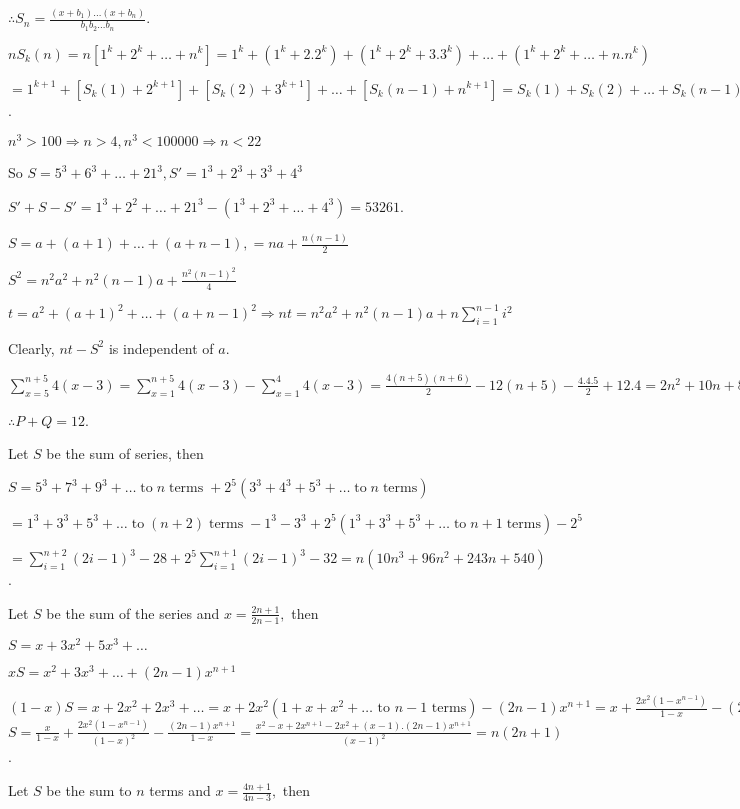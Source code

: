   $\therefore S_n = \frac{(x + b_1)\ldots (x+b_n)}{b_1b_2\ldots b_n}$.
\item $nS_k(n) = n[1^k + 2^k + \ldots + n^k] = 1^k + (1^k + 2.2^k) + (1^k + 2^k + 3.3^k) + \ldots + (1^k +
  2^k + \ldots + n.n^k)$

  $= 1^{k + 1} + [S_k(1) + 2^{k + 1}] + [S_k(2) + 3^{k + 1}] + \ldots + [S_k(n - 1) + n^{k + 1}] = S_k(1) +
  S_k(2) + \ldots + S_k(n - 1) + S_{k + 1}(n)$.
\item $n^3 > 100 \Rightarrow n > 4, n^3 < 100000 \Rightarrow n < 22$

  So $S = 5^3 + 6^3 + \ldots + 21^3, S' = 1^3 + 2^3 + 3^3 + 4^3$

  $S' + S - S' = 1^3 + 2^2 + \ldots + 21^3 - (1^3 + 2^3 + \ldots + 4^3) = 53261$.
\item $S = a + (a + 1) + \ldots + (a + n - 1), = na + \frac{n(n - 1)}{2}$

  $S^2 = n^2a^2 + n^2(n - 1)a + \frac{n^2(n - 1)^2}{4}$

  $t = a^2 + (a + 1)^2 + \ldots + (a + n - 1)^2\Rightarrow nt = n^2a^2 + n^2(n - 1)a + n\displaystyle\sum_{i
  = 1}^{n - 1}i^2$

  Clearly, $nt - S^2$ is independent of $a$.
\item $\displaystyle\sum_{x = 5}^{n + 5}4(x - 3) = \sum_{x = 1}^{n + 5}4(x - 3) - \sum_{x = 1}^{4}4(x - 3) = \frac{4(n +
  5)(n + 6)}{2} - 12(n + 5) - \frac{4.4.5}{2} + 12.4 = 2n^2 + 10n + 8$

  $\therefore P + Q = 12$.
\item Let $S$ be the sum of series, then

  $S = 5^3 + 7^3 + 9^3 + \ldots \;\text{to}\;n\;\text{terms}\; + 2^5(3^3 + 4^3 + 5^3 + \ldots
  \;\text{to}\;n\;\text{terms})$

  $= 1^3 + 3^3 + 5^3 + \ldots \;\text{to}\;(n + 2)\;\text{terms}\; - 1^3 - 3^3 + 2^5(1^3 + 3^3 + 5^3 + \ldots \;\text{to}\;n +
  1\;\text{terms}) - 2^5$

  $= \displaystyle\sum_{i = 1}^{n + 2}(2i - 1)^3 - 28 + 2^5\sum_{i = 1}^{n + 1}(2i - 1)^3 - 32 = n(10n^3 + 96n^2 + 243n +
  540)$.
\item Let $S$ be the sum of the series and $x = \frac{2n + 1}{2n - 1},$ then

  $S = x + 3x^2 + 5x^3 + \ldots$

  $xS = x^2 + 3x^3 + \ldots + (2n - 1)x^{n + 1}$

  $(1 - x)S = x + 2x^2 + 2x^3 + \ldots = x + 2x^2(1 + x + x^2 + \ldots \text{~to~}n - 1\text{~terms}) -(2n -
  1)x^{n+1} = x + \frac{2x^2(1 - x^{n - 1})}{1 - x} - (2n - 1)x^{n+1}$
  $S = \frac{x}{1 - x} + \frac{2x^2(1 - x^{n - 1})}{(1 - x)^2} - \frac{(2n - 1)x^{n+1}}{1 - x} = \frac{x^2 -
    x + 2x^{n + 1} - 2x^2 + (x - 1).(2n - 1)x^{n + 1}}{(x - 1)^2} = n(2n + 1)$.
\item Let $S$ be the sum to $n$ terms and $x = \frac{4n + 1}{4n - 3},$ then

